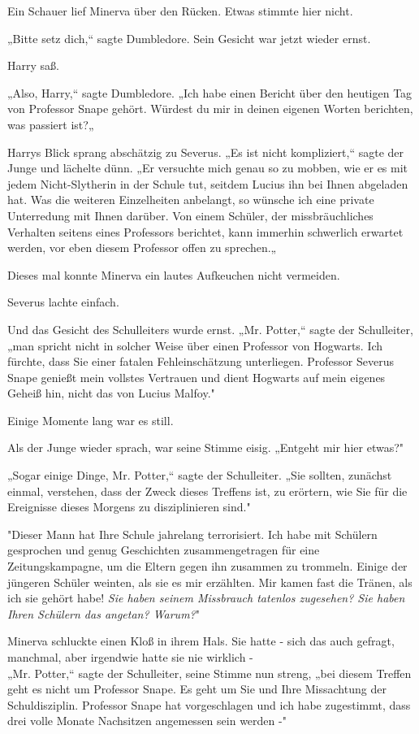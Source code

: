 {Ein Schauer lief Minerva über den Rücken. Etwas stimmte hier nicht.

„Bitte setz dich,“ sagte Dumbledore. Sein Gesicht war jetzt wieder ernst.

Harry saß.

„Also, Harry,“ sagte Dumbledore. „Ich habe einen Bericht über den heutigen Tag von Professor Snape gehört. Würdest du mir in deinen eigenen Worten berichten, was passiert ist?„

Harrys Blick sprang abschätzig zu Severus. „Es ist nicht kompliziert,“ sagte der Junge und lächelte dünn. „Er versuchte mich genau so zu mobben, wie er es mit jedem Nicht-Slytherin in der Schule tut, seitdem Lucius ihn bei Ihnen abgeladen hat. Was die weiteren Einzelheiten anbelangt, so wünsche ich eine private Unterredung mit Ihnen darüber. Von einem Schüler, der missbräuchliches Verhalten seitens eines Professors berichtet, kann immerhin schwerlich erwartet werden, vor eben diesem Professor offen zu sprechen.„

Dieses mal konnte Minerva ein lautes Aufkeuchen nicht vermeiden.

Severus lachte einfach.

Und das Gesicht des Schulleiters wurde ernst. „Mr. Potter,“ sagte der Schulleiter, „man spricht nicht in solcher Weise über einen Professor von Hogwarts. Ich fürchte, dass Sie einer fatalen Fehleinschätzung unterliegen. Professor Severus Snape genießt mein vollstes Vertrauen und dient Hogwarts auf mein eigenes Geheiß hin, nicht das von Lucius Malfoy."

Einige Momente lang war es still.

Als der Junge wieder sprach, war seine Stimme eisig. „Entgeht mir hier etwas?"

„Sogar einige Dinge, Mr. Potter,“ sagte der Schulleiter. „Sie sollten, zunächst einmal, verstehen, dass der Zweck dieses Treffens ist, zu erörtern, wie Sie für die Ereignisse dieses Morgens zu disziplinieren sind."

"Dieser Mann hat Ihre Schule jahrelang terrorisiert. Ich habe mit Schülern gesprochen und genug Geschichten zusammengetragen für eine Zeitungskampagne, um die Eltern gegen ihn zusammen zu trommeln. Einige der jüngeren Schüler weinten, als sie es mir erzählten. Mir kamen fast die Tränen, als ich sie gehört habe! \emph{Sie haben seinem Missbrauch tatenlos zugesehen? Sie haben Ihren Schülern das angetan? Warum?}"

Minerva schluckte einen Kloß in ihrem Hals. Sie hatte - sich das auch gefragt, manchmal, aber irgendwie hatte sie nie wirklich -\\ „Mr. Potter,“ sagte der Schulleiter, seine Stimme nun streng, „bei diesem Treffen geht es nicht um Professor Snape. Es geht um Sie und Ihre Missachtung der Schuldisziplin. Professor Snape hat vorgeschlagen und ich habe zugestimmt, dass drei volle Monate Nachsitzen angemessen sein werden -"

}
